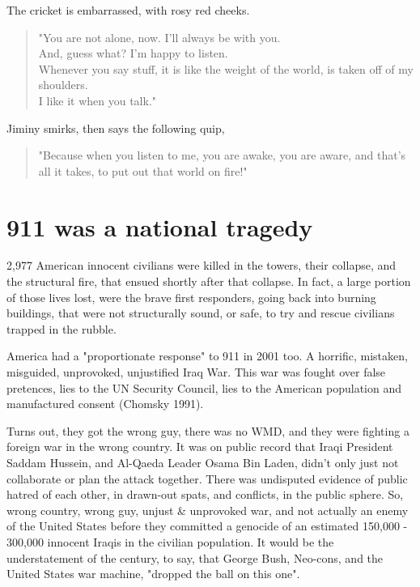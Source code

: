 \documentclass[16pt,openany,oneside]{book}
\begin{document}
The cricket is embarrassed, with rosy red cheeks.

\begin{quote}
    "You are not alone, now. I'll always be with you.  \\
     And, guess what? I'm happy to listen.  \\
     Whenever you say stuff, it is like the weight of the world, is taken off of my shoulders. \\
     I like it when you talk."
\end{quote}

Jiminy smirks, then says the following quip, 

\begin{quote}
     "Because when you listen to me, you are awake, you are aware, and that's all it takes, to put out that world on fire!"
 \end{quote}   

\chapter{911 was a national tragedy}

2,977 American innocent civilians were killed in the towers, their collapse, and the structural fire, that ensued shortly after that collapse. In fact, a large portion of those lives lost, were the brave first responders, going back into burning buildings, that were not structurally sound, or safe, to try and rescue civilians trapped in the rubble.

America had a "proportionate response" to 911 in 2001 too. A horrific, mistaken, misguided, unprovoked, unjustified Iraq War. This war was fought over false pretences, lies to the UN Security Council, lies to the American population and manufactured consent (Chomsky 1991). 

Turns out, they got the wrong guy, there was no WMD, and they were fighting a foreign war in the wrong country. It was on public record that Iraqi President Saddam Hussein, and Al-Qaeda Leader Osama Bin Laden, didn't only just not collaborate or plan the attack together. There was undisputed evidence of public hatred of each other, in drawn-out spats, and conflicts, in the public sphere. So, wrong country, wrong guy, unjust \& unprovoked war, and not actually an enemy of the United States before they committed a genocide of an estimated 150,000 - 300,000 innocent Iraqis in the civilian population. It would be the understatement of the century, to say, that George Bush, Neo-cons, and the United States war machine, "dropped the ball on this one".
\end{document}

